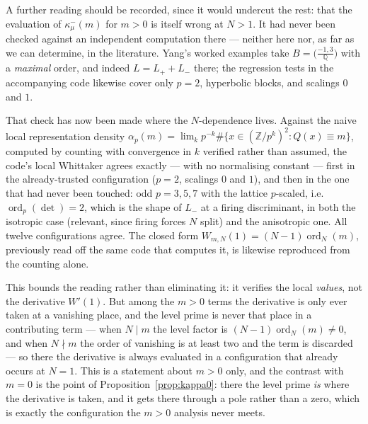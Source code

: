 \documentclass[11pt,reqno]{amsart}
\theoremstyle{plain}
\theoremstyle{definition}
\DeclareMathOperator{\ord}{ord}
\newcommand{\Q}{\mathbb{Q}}
\newcommand{\Z}{\mathbb{Z}}
\newcommand{\Lm}{L_{-}}
\newcommand{\Lp}{L_{+}}
\begin{document}
A further reading should be recorded, since it would undercut the rest: that the evaluation of
$\kappa^-_\mu(m)$ for $m>0$ is itself wrong at $N>1$. It had never been checked against an
independent computation there --- neither here nor, as far as we can determine, in the literature.
Yang's worked examples \cite[Ex.~21--24]{Yang} take $B=\bigl(\tfrac{-1,3}{\Q}\bigr)$ with a
\emph{maximal} order, and indeed $L=\Lp+\Lm$ there; the regression tests in the accompanying code
likewise cover only $p=2$, hyperbolic blocks, and scalings $0$ and $1$.

That check has now been made where the $N$-dependence lives. Against the naive local
representation density $\alpha_p(m)=\lim_k p^{-k}\#\{x\in(\Z/p^k)^2: Q(x)\equiv m\}$, computed by
counting with convergence in $k$ verified rather than assumed, the code's local Whittaker agrees
exactly --- with no normalising constant --- first in the already-trusted configuration ($p=2$,
scalings $0$ and $1$), and then in the one that had never been touched: odd $p=3,5,7$ with the
lattice $p$-scaled, i.e.\ $\ord_p(\det)=2$, which is the shape of $L_-$ at a firing discriminant,
in both the isotropic case (relevant, since firing forces $N$ split) and the anisotropic one. All
twelve configurations agree. The closed form $W_{m,N}(1)=(N-1)\ord_N(m)$, previously read off the same
code that computes it, is likewise reproduced from the counting alone.

This bounds the reading rather than eliminating it: it verifies the local \emph{values}, not the
derivative $W'(1)$. But among the $m>0$ terms the derivative is only ever taken at a vanishing
place, and the level prime is never that place in a contributing term --- when $N\mid m$ the level
factor is $(N-1)\ord_N(m)\neq0$, and when $N\nmid m$ the order of vanishing is at least two and the
term is discarded --- so there the derivative is always evaluated in a configuration that already
occurs at $N=1$. This is a statement about $m>0$ only, and the contrast with $m=0$ is the point of
Proposition~\ref{prop:kappa0}: there the level prime \emph{is} where the derivative is taken, and it
gets there through a pole rather than a zero, which is exactly the configuration the $m>0$ analysis
never meets.
\end{document}
